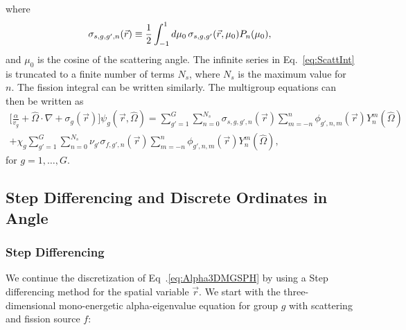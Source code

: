 where
\begin{equation}
	\sigma_{s,g,g',n}(\vec{r}) \equiv \frac{1}{2} \int_{-1}^{1} \mathop{}\!d \mu_{0} \, \sigma_{s,g,g'}(\vec{r},\mu_{0}) P_{n}(\mu_{0}),
\end{equation}
and $\mu_{0}$ is the cosine of the scattering angle. The infinite series in Eq.~\ref{eq:ScattInt} is truncated to a finite number of terms $N_{s}$, where $N_{s}$ is the maximum value for $n$. The fission integral can be written similarly. The multigroup equations can then be written as
\begin{multline}
	\bigg [ \frac{\alpha}{v_{g}} + \hat{\Omega} \cdot \nabla + \sigma_{g}(\vec{r}) \bigg ] \psi_{g}(\vec{r},\hat{\Omega}) = \sum_{g'=1}^{G} \sum_{n=0}^{N_{s}} \sigma_{s,g,g',n}(\vec{r}) \sum_{m=-n}^{n} \phi_{g',n,m}(\vec{r}) Y_{n}^{m}(\hat{\Omega}) \\ + \chi_{g} \sum_{g'=1}^{G} \sum_{n=0}^{N_{s}} \nu_{g'} \sigma_{f,g',n}(\vec{r}) \sum_{m=-n}^{n} \phi_{g',n,m}(\vec{r}) Y_{n}^{m}(\hat{\Omega}), 
	\label{eq:Alpha3DMGSPH}
\end{multline}
for $g = 1, \dots, G$.

\subsection{Step Differencing and Discrete Ordinates in Angle}

\subsubsection{Step Differencing}

We continue the discretization of Eq~.\ref{eq:Alpha3DMGSPH} by using a Step differencing method \cite{lewis_computational_1984} for the spatial variable $\vec{r}$. We start with the three-dimensional mono-energetic alpha-eigenvalue equation for group $g$ with scattering and fission source $f$:

